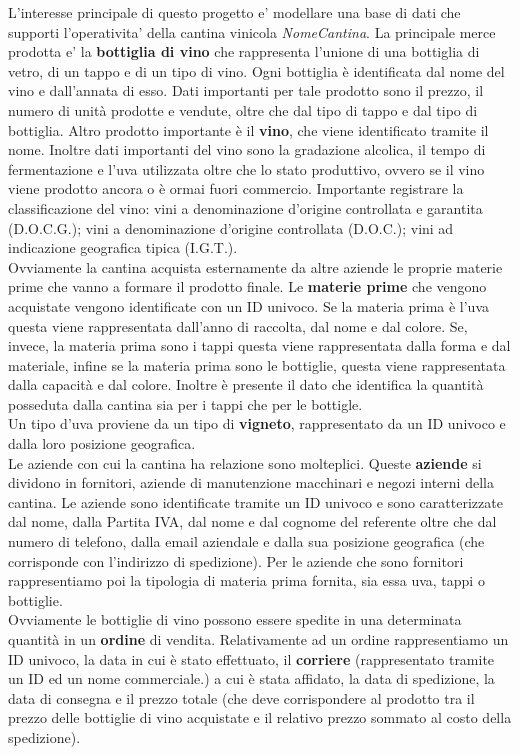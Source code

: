 L'interesse principale di questo progetto e' modellare una base di dati che supporti l'operativita' della cantina vinicola \emph{NomeCantina}. La principale merce prodotta e' la \textbf{bottiglia di vino} che rappresenta l'unione di una bottiglia di vetro, di un tappo e di un tipo di vino. Ogni bottiglia è identificata dal nome del vino e dall'annata di esso. Dati importanti per tale prodotto sono il prezzo, il numero di unità prodotte e vendute, oltre che dal tipo di tappo e dal tipo di bottiglia.
Altro prodotto importante è il \textbf{vino}, che viene identificato tramite il nome. Inoltre dati importanti del vino sono la gradazione alcolica, il tempo di fermentazione e l'uva utilizzata oltre che lo stato produttivo, ovvero se il vino viene prodotto ancora o è ormai fuori commercio. Importante registrare la classificazione del vino: vini a denominazione d'origine controllata e garantita (D.O.C.G.); vini a denominazione d'origine controllata (D.O.C.); vini ad indicazione geografica tipica (I.G.T.).\\ Ovviamente la cantina acquista esternamente da altre aziende le proprie materie prime che vanno a formare il prodotto finale. Le \textbf{materie prime} che vengono acquistate vengono identificate con un ID univoco. Se la materia prima è l'uva questa viene rappresentata dall'anno di raccolta, dal nome e dal colore. Se, invece, la materia prima sono i tappi questa viene rappresentata dalla forma e dal materiale, infine se la materia prima sono le bottiglie, questa viene rappresentata dalla capacità e dal colore. Inoltre è presente il dato che identifica la quantità posseduta dalla cantina sia per i tappi che per le bottigle.\\
Un tipo d'uva proviene da un tipo di \textbf{vigneto}, rappresentato da un ID univoco e dalla loro posizione geografica. \\
Le aziende con cui la cantina ha relazione sono molteplici. Queste \textbf{aziende} si dividono in fornitori, aziende di manutenzione macchinari e negozi interni della cantina. Le aziende sono identificate tramite un ID univoco e sono caratterizzate dal nome, dalla Partita IVA, dal nome e dal cognome del referente oltre che dal numero di telefono, dalla email aziendale e dalla sua posizione geografica (che corrisponde con l'indirizzo di spedizione). Per le aziende che sono fornitori rappresentiamo poi la tipologia di materia prima fornita, sia essa uva, tappi o bottiglie.\\
Ovviamente le bottiglie di vino possono essere spedite in una determinata quantità in un \textbf{ordine} di vendita. Relativamente ad un ordine rappresentiamo un ID univoco, la data in cui è stato effettuato, il \textbf{corriere} (rappresentato tramite un ID ed un nome commerciale.) a cui è stata affidato, la data di spedizione, la data di consegna e il prezzo totale (che deve corrispondere al prodotto tra il prezzo delle bottiglie di vino acquistate e il relativo prezzo sommato al costo della spedizione).\\
